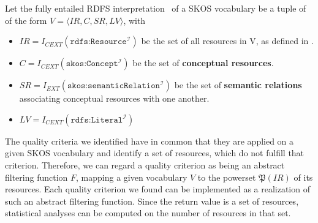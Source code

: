 \begin{definition} Let the fully entailed RDFS interpretation~\cite{RDFSEM2012} of a SKOS vocabulary be a tuple of of the form $V = \langle IR, C, SR, LV \rangle$, with
    

\begin{itemize}
	\item \(IR = I_{CEXT}(\texttt{rdfs:Resource}^\mathcal{I})\) be the set of all resources in V, as defined in \cite{RDFSEM2012}.

	\item \(C = I_{CEXT}(\texttt{skos:Concept}^\mathcal{I})\) be the set of \textbf{conceptual resources}.



	\item \(SR = I_{EXT}(\texttt{skos:semanticRelation}^\mathcal{I})\) be the set of \textbf{semantic relations} associating conceptual resources with one another.

	\item $LV = I_{CEXT}(\texttt{rdfs:Literal}^\mathcal{I})$

\end{itemize}

\end{definition}


The quality criteria we identified have in common that they are applied on a given SKOS vocabulary and identify a set of resources, which do not fulfill that criterion. Therefore, we can regard a quality criterion as being an abstract filtering function $F$, mapping a given vocabulary $V$ to the powerset $\mathfrak{P}(IR)$ of its resources. Each quality criterion we found can be implemented as a realization of such an abstract filtering function. Since the return value is a set of resources, statistical analyses can be computed on the number of resources in that set.

